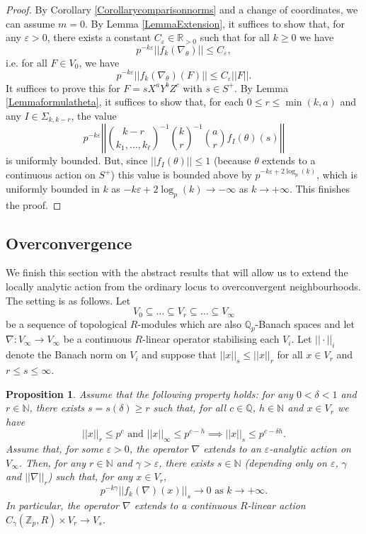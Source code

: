 \documentclass[10pt, oneside]{amsart}
\numberwithin{equation}{subsection}
\newtheorem{proposition}[equation]{Proposition}
\theoremstyle{definition}
\theoremstyle{remark}
\newcommand{\mbb}[1]{\mathbb{#1}}
\def\Q{\mathbb{Q}}
\def\R{{\mathbb{R}}}
\def\N{{\mathbb{N}}}
\def\qp{{\Q_p}}
\def\epsilon{\varepsilon}
\begin{document}
\begin{proof}
By Corollary \ref{Corollarycomparisonnorms} and a change of coordinates, we can assume $m = 0$. By Lemma \ref{LemmaExtension}, it suffices to show that, for any $\epsilon > 0$, there exists a constant $C_\epsilon \in \R_{>0}$ such that for all $k \geq 0$ we have
\[ p^{-k \epsilon} |\!|f_k(\nabla_\theta) |\!| \leq C_\epsilon, \]
i.e. for all $F \in V_0$, we have
\[ p^{-k \epsilon} |\!|f_k(\nabla_\theta) (F) |\!| \leq C_\epsilon |\!|F|\!|. \]
It suffices to prove this for $F = s X^a Y^b Z^c$ with $s \in S^+$. By Lemma \ref{Lemmaformulatheta}, it suffices to show that, for each $0 \leq r \leq \min(k, a)$ and any $I \in \Sigma_{k, k-r}$, the value
\[ p^{-k \epsilon} \left|\! \left| \binom{k - r}{k_1, \ldots, k_\ell}^{-1} \binom{k}{r}^{-1} \binom{a}{r}  f_I(\theta)(s) \right| \! \right| \]
is uniformly bounded. But, since $|\!|f_I(\theta)|\!| \leq 1$ (because $\theta$ extends to a continuous action on $S^+$) this value is bounded above by $p^{-k \epsilon + 2\log_p(k)}$, which is uniformly bounded in $k$ as $-k \epsilon + 2 \log_p(k) \to - \infty$ as $k \to + \infty$. This finishes the proof.
\end{proof}

\subsection{Overconvergence} \label{SubSecOC}

We finish this section with the abstract results that will allow us to extend the locally analytic action from the ordinary locus to overconvergent neighbourhoods. The setting is as follows. Let
\[ V_0 \subseteq \ldots \subseteq V_r \subseteq \ldots \subseteq V_\infty \]
be a sequence of topological $R$-modules which are also $\qp$-Banach spaces and let $\nabla : V_\infty \to V_\infty$ be a continuous $R$-linear operator stabilising each $V_i$. Let $| \! | \cdot | \! |_i$ denote the Banach norm on $V_i$ and suppose that $| \! | x | \! |_s \leq | \! | x | \! |_r$ for all $x \in V_r$ and $r \leq s \leq \infty$.

\begin{proposition} \label{OverconvergenceOfActionProp}
Assume that the following property holds: for any $0 < \delta < 1$ and $r \in \N$, there exists $s = s(\delta) \geq r$ such that, for all $c \in \Q$, $h \in \N$ and $x \in V_r$ we have
\begin{equation} \label{Equationproperty}
 |\!|x|\!|_r \leq p^c \text{ and } |\!|x|\!|_{\infty} \leq p^{c - h} \implies |\!|x|\!|_s \leq p^{c -\delta h}.
\end{equation}
Assume that, for some $\epsilon > 0$, the operator $\nabla$ extends to an $\epsilon$-analytic action on $V_\infty$. Then, for any $r \in \mbb{N}$ and $\gamma > \epsilon$, there exists $s \in \N$ (depending only on $\epsilon$, $\gamma$ and $|\!|\nabla|\!|_r$) such that, for any $x\in V_r$,
\[ p^{-k \gamma} |\!|f_k(\nabla)(x)|\!|_s \to 0 \text{ as } k \to +\infty. \]
In particular, the operator $\nabla$ extends to a continuous $R$-linear action $C_{\gamma}(\mbb{Z}_p, R) \times V_r \to V_s$.
\end{proposition}
\end{document}
